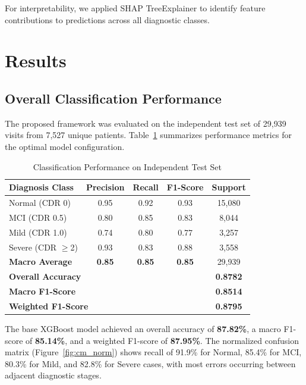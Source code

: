 \documentclass[preprint,12pt]{elsarticle}
\begin{document}
For interpretability, we applied SHAP \cite{lundberg2017} TreeExplainer to identify feature contributions to predictions across all diagnostic classes.

\section{Results}

\subsection{Overall Classification Performance}

The proposed framework was evaluated on the independent test set of 29,939 visits from 7,527 unique patients. Table~\ref{tab:results} summarizes performance metrics for the optimal model configuration.

\begin{table}[htbp]
\caption{Classification Performance on Independent Test Set}
\label{tab:results}
\begin{center}
\begin{tabular}{lcccc}
\toprule
\textbf{Diagnosis Class} & \textbf{Precision} & \textbf{Recall} & \textbf{F1-Score} & \textbf{Support} \\
\midrule
Normal (CDR 0)      & 0.95 & 0.92 & 0.93 & 15,080 \\
MCI (CDR 0.5)       & 0.80 & 0.85 & 0.83 & 8,044 \\
Mild (CDR 1.0)      & 0.74 & 0.80 & 0.77 & 3,257 \\
Severe (CDR $\geq$2) & 0.93 & 0.83 & 0.88 & 3,558 \\
\midrule
\textbf{Macro Average} & \textbf{0.85} & \textbf{0.85} & \textbf{0.85} & 29,939 \\
\midrule
\multicolumn{4}{l}{\textbf{Overall Accuracy}} & \textbf{0.8782} \\
\multicolumn{4}{l}{\textbf{Macro F1-Score}} & \textbf{0.8514} \\
\multicolumn{4}{l}{\textbf{Weighted F1-Score}} & \textbf{0.8795} \\
\bottomrule
\end{tabular}
\end{center}
\end{table}

The base XGBoost model achieved an overall accuracy of \textbf{87.82\%}, a macro F1-score of \textbf{85.14\%}, and a weighted F1-score of \textbf{87.95\%}. The normalized confusion matrix (Figure~\ref{fig:cm_norm}) shows recall of 91.9\% for Normal, 85.4\% for MCI, 80.3\% for Mild, and 82.8\% for Severe cases, with most errors occurring between adjacent diagnostic stages.
\end{document}
